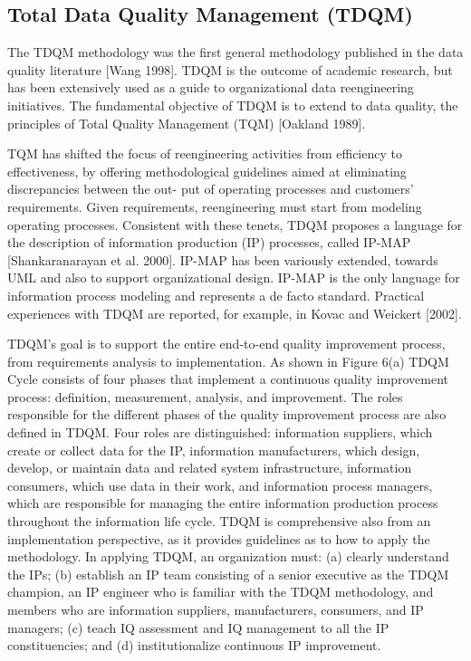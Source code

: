 \documentclass[pdftex,english,oribibl]{llncs}
\begin{document}
\subsection{Total Data Quality Management (TDQM)}

The TDQM methodology was the first general methodology published in the data quality literature [Wang 1998]. TDQM is the outcome of academic research, but has been extensively used as a guide to organizational data reengineering initiatives. The fundamental objective of TDQM is to extend to data quality, the principles of Total Quality Management (TQM) [Oakland 1989].

TQM has shifted the focus of reengineering activities from efficiency to effectiveness, by offering methodological guidelines aimed at eliminating discrepancies between the out- put of operating processes and customers’ requirements. Given requirements, reengineering must start from modeling operating processes. Consistent with these tenets, TDQM proposes a language for the description of information production (IP) processes, called IP-MAP [Shankaranarayan et al. 2000]. IP-MAP has been variously extended, towards UML and also to support organizational design. IP-MAP is the only language for information process modeling and represents a de facto standard. Practical experiences with TDQM are reported, for example, in Kovac and Weickert [2002].

TDQM’s goal is to support the entire end-to-end quality improvement process, from requirements analysis to implementation.
As shown in Figure 6(a) TDQM Cycle consists of four phases that implement a continuous quality improvement process: definition, measurement, analysis, and improvement.
The roles responsible for the different phases of the quality improvement process are also defined in TDQM.
Four roles are distinguished: information suppliers, which create or collect data for the IP, information manufacturers, which design, develop, or maintain data and related system infrastructure, information consumers, which use data in their work, and information process managers, which are responsible for managing the entire information production process throughout the information life cycle.
TDQM is comprehensive also from an implementation perspective, as it provides guidelines as to how to apply the methodology.
In applying TDQM, an organization must:
(a) clearly understand the IPs;
(b) establish an IP team consisting of a senior executive as the TDQM champion, an IP engineer who is familiar with the TDQM methodology, and members who are information suppliers, manufacturers, consumers, and IP managers;
(c) teach IQ assessment and IQ management to all the IP constituencies; and
(d) institutionalize continuous IP improvement.
\end{document}

